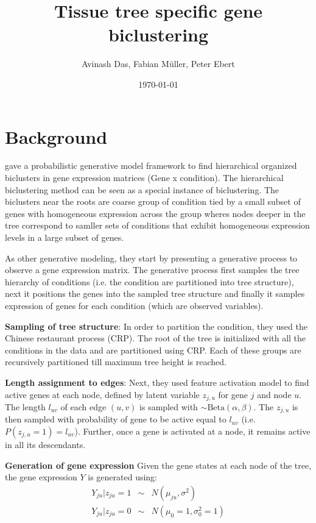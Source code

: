 \documentclass{article}
\title{
Tissue tree specific gene biclustering
}
\author{Avinash Das, Fabian M\"uller, Peter Ebert}
\date{\today}
\begin{document}
\pagestyle{fancy}

\maketitle
\section{Background}

\cite{Kaski2010} gave a probabilistic generative model framework to find hierarchical organized biclusters in gene expression 
matrices (Gene x condition). The hierarchical biclustering method can be seen as a special instance of biclustering. 
The biclusters near the roots are coarse group of condition tied by a small subset of genes
with homogeneous expression across the group wheres nodes deeper in the tree correspond to samller sets of conditions that exhibit homogeneous expression levels in a large subset of genes.

As other generative modeling, they start by presenting a generative process to 
observe a gene expression matrix. The generative process first samples the tree hierarchy 
of conditions (i.e. the condition are partitioned into tree structure), next 
it positions the genes into the sampled tree structure and finally it samples expression of genes
for each condition (which are observed variables). 

\par \textbf{Sampling of tree structure}:
In order to partition the condition, they used the Chinese restaurant process (CRP). The root of the tree
is initialized with all the conditions in the data and are partitioned using CRP. Each of these groups are 
recursively partitioned till maximum tree height is reached. 

\par \textbf{Length assignment to edges}:
Next, they used feature activation model to find active genes at each node, defined by latent variable $z_{j,u}$ for
gene $j$ and node $u$.
The length $l_{uv}$ of each edge $(u,v)$ is sampled with $ \sim \text{Beta}(\alpha,\beta)$. 
The $z_{j,u}$ 
is then sampled with probability of gene to be active equal to $l_{uv}$ (i.e. $P(z_{j,u} = 1) = l_{uv}$). 
Further, once a gene is activated at a node, it remains active in all its descendants.  


\par \textbf{Generation of gene expression}
Given the gene states at each node of the tree, the gene expression $Y$ is generated using:
\begin{eqnarray}
	Y_{ju}|z_{ju}=1  &\sim& N(\mu_{ju}, \sigma^2) \nonumber\\
	Y_{ju}|z_{ju}=0  &\sim& N(\mu_{0}=1, \sigma_0^2=1) 
	\label{eqn:Kexp}
\end{eqnarray}
\end{document}
